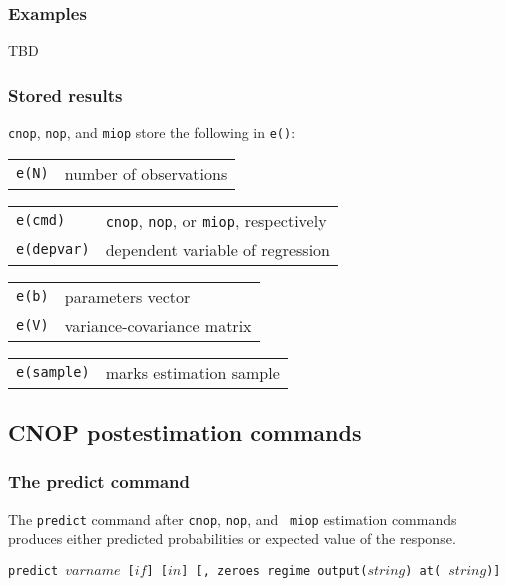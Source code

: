\documentclass[letterpaper,fleqn,11pt]{article}
\begin{document}
\subsubsection*{Examples}

TBD

\subsubsection*{Stored results}

\texttt{cnop}, \texttt{nop}, and \texttt{miop} store the following in 
\texttt{e()}:


\begin{tabular}{p{3cm}p{12cm}}
\texttt{e(N)} & number of observations%
\end{tabular}


\begin{tabular}{p{3cm}p{12cm}}
\texttt{e(cmd)} & \texttt{cnop}, \texttt{nop}, or \texttt{miop}, respectively
\\ 
\texttt{e(depvar)} & dependent variable of regression%
\end{tabular}


\begin{tabular}{p{3cm}p{12cm}}
\texttt{e(b)} & parameters vector \\ 
\texttt{e(V)} & variance-covariance matrix%
\end{tabular}


\begin{tabular}{p{3cm}p{12cm}}
\texttt{e(sample)} & marks estimation sample%
\end{tabular}

\subsection*{CNOP postestimation commands}

\subsubsection*{The predict command}

The \texttt{predict} command after \texttt{cnop}, \texttt{nop}, and \texttt{%
miop} estimation commands produces either predicted probabilities or
expected value of the response.

\texttt{predict $varname$ [$if$] [$in$] [, zeroes regime output($string$) at(%
$string$)]}
\end{document}
